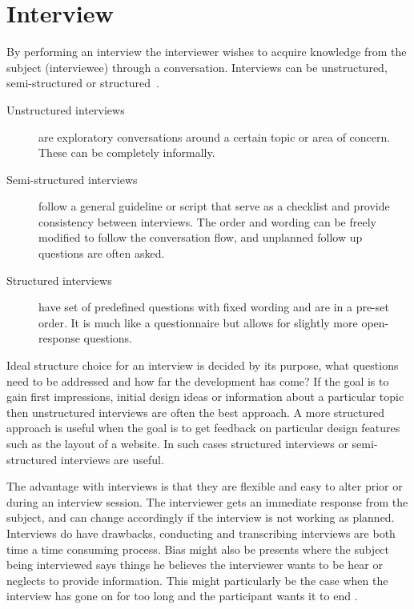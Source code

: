 \section{Interview}
By performing an interview the interviewer wishes to acquire knowledge from the subject (interviewee) through a conversation. Interviews can be unstructured, semi-structured or structured~\cite{interactionDesign}.
\begin{description}
  \item[Unstructured interviews] are exploratory conversations around a certain topic or area of concern. These can be completely informally.
  \item[Semi-structured interviews] follow a general guideline or script that serve as a checklist and provide consistency between interviews. The order and wording can be freely modified to follow the conversation flow, and unplanned follow up questions are often asked.
  \item[Structured interviews] have set of predefined questions with fixed wording and are in a pre-set order. It is much like a questionnaire but allows for slightly more open-response questions.
\end{description}
Ideal structure choice for an interview is decided by its purpose, what questions need to be addressed and how far the development has come? If the goal is to gain first impressions, initial design ideas or information about a particular topic then unstructured interviews are often the best approach. A more structured approach is useful when the goal is to get feedback on particular design features such as the layout of a website. In such cases  structured interviews or semi-structured interviews are useful.

The advantage with interviews is that they are flexible and easy to alter prior or during an interview session. The interviewer gets an immediate response from the subject, and can change accordingly if the interview is not working as planned. Interviews do have drawbacks, conducting and transcribing interviews are both time a time consuming process. Bias might also be presents where the subject being interviewed says things he believes the interviewer wants to be hear or neglects to provide information. This might particularly be the case when the interview has gone on for too long and the participant wants it to end \cite{realWorldResearch}.

